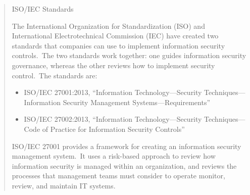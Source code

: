 \begin{formal}

          \begin{quote}
          
                    \begin{description}
                              \item[ISO/IEC Standards]
                    \end{description}
                    
                              The International Organization for Standardization (ISO) and International Electrotechnical Commission (IEC) have created two standards that companies can use to implement information security controls.\ The two standards work together: one guides information security governance, whereas the other reviews how to implement security control.\ The standards are:
                              
                              \begin{itemize}
                                        \item ISO/IEC 27001:2013, ``Information Technology---Security Techniques---Information Security Management Systems---Requirements''
                                        \item ISO/IEC 27002:2013, ``Information Technology---Security Techniques---Code of Practice for Information Security Controls''
                             \end{itemize}
                             
                             ISO/IEC 27001 provides a framework for creating an information security management system.\ It uses a risk-based approach to review how information security is managed within an organization, and reviews the processes that management teams must consider to operate monitor, review, and maintain IT systems.
                             

\end{quote}
\end{formal}
